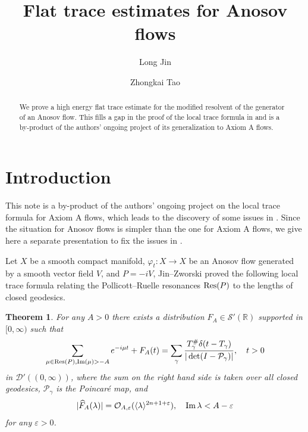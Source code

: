 \documentclass[reqno,12pt,letterpaper]{amsart}
\newtheorem{thm}{Theorem}
\numberwithin{equation}{section}
\numberwithin{prop}{section}
\renewcommand{\Im}{\mathop{\rm Im}\nolimits}
\DeclareMathOperator{\Res}{{\rm Res}}
\newcommand{\Ocal}{{\mathcal O}}
\newcommand{\Scal}{{\mathcal S}}
\newcommand{\RR}{{\mathbb R}}
\begin{document}
\title{Flat trace estimates for Anosov flows}

\author{Long Jin}
\address{Yau Mathematical Sciences Center, Tsinghua University, Beijing, China \& Beijing Institute of Mathematical Sciences and Applications, Beijing, China}

\author{Zhongkai Tao}
\address{Department of Mathematics, Evans Hall, University of California,
Berkeley, CA 94720, USA}

\begin{abstract}
We prove a high energy flat trace estimate for the modified resolvent of the generator of an Anosov flow. This fills a gap in the proof of the local trace formula in \cite{local} and is a by-product of the authors' ongoing project of its generalization to Axiom A flows.
\end{abstract}

\maketitle
\section{Introduction}
\label{s:intro}
This note is a by-product of the authors' ongoing project on the local trace formula for Axiom A flows, which leads to the discovery of some issues in \cite{local}. Since the situation for Anosov flows is simpler than the one for Axiom A flows, we give here a separate presentation to fix the issues in \cite{local}. 

Let $X$ be a smooth compact manifold, $\varphi_t:X\to X$ be an Anosov flow generated by a smooth vector field $V$, and $P=-iV$, Jin--Zworski \cite{local} proved the following local trace formula relating the Pollicott--Ruelle resonances $\Res(P)$ to the lengths of closed geodesics.
\begin{thm}\label{tracef}
For any $A>0$ there exists a distribution $F_A\in \Scal'(\RR)$ supported in $[0,\infty)$ such that
\begin{align*}
    \sum\limits_{\mu\in\Res(P),\Im(\mu)>-A}e^{-i\mu t}+F_A(t)=\sum\limits_{\gamma }\frac{T_\gamma^\#\delta(t-T_\gamma)}{|\det(I-\mathcal{P}_\gamma)|},\quad t>0
\end{align*}
in $\mathcal{D}'((0,\infty))$, where the sum on the right hand side is taken over all closed geodesics, $\mathcal{P}_\gamma$ is the Poincar\'e map, and
\begin{align}
\label{e:error}
    |\widehat{F}_A(\lambda)|=\Ocal_{A,\varepsilon}(\langle \lambda\rangle^{2n+1+\varepsilon}),\quad \Im \lambda<A-\varepsilon
\end{align}
for any $\varepsilon>0$.
\end{thm}
\end{document}
